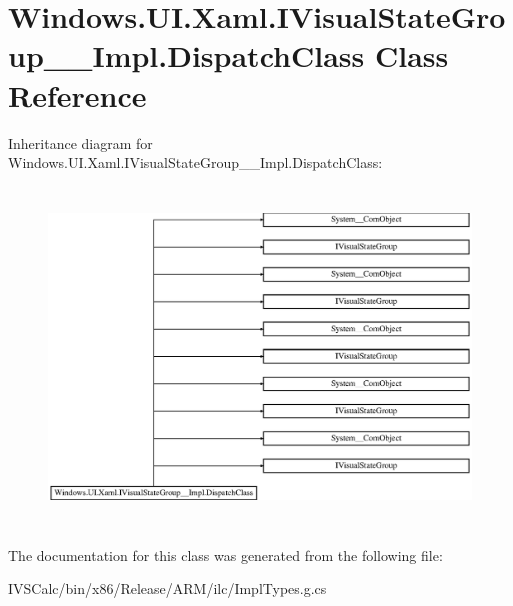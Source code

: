 \hypertarget{class_windows_1_1_u_i_1_1_xaml_1_1_i_visual_state_group_____impl_1_1_dispatch_class}{}\section{Windows.\+U\+I.\+Xaml.\+I\+Visual\+State\+Group\+\_\+\+\_\+\+Impl.\+Dispatch\+Class Class Reference}
\label{class_windows_1_1_u_i_1_1_xaml_1_1_i_visual_state_group_____impl_1_1_dispatch_class}
Inheritance diagram for Windows.\+U\+I.\+Xaml.\+I\+Visual\+State\+Group\+\_\+\+\_\+\+Impl.\+Dispatch\+Class\+:\begin{figure}[H]
\begin{center}
\leavevmode
\includegraphics[height=9.005848cm]{class_windows_1_1_u_i_1_1_xaml_1_1_i_visual_state_group_____impl_1_1_dispatch_class}
\end{center}
\end{figure}


The documentation for this class was generated from the following file\+:\begin{DoxyCompactItemize}
\item 
I\+V\+S\+Calc/bin/x86/\+Release/\+A\+R\+M/ilc/Impl\+Types.\+g.\+cs\end{DoxyCompactItemize}
